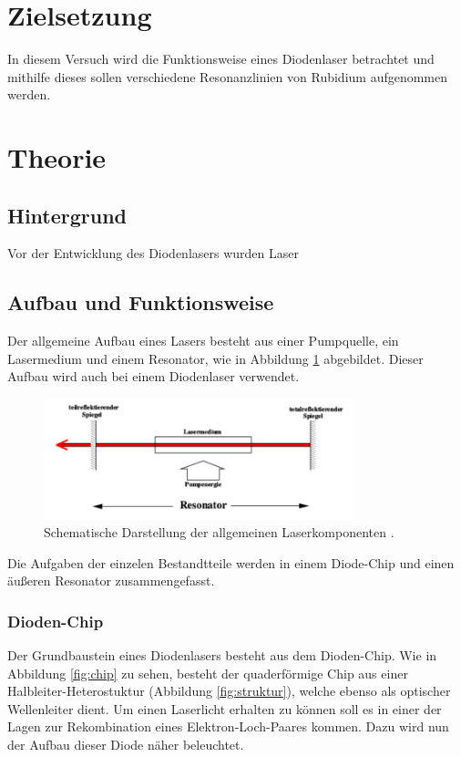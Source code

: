 \section{Zielsetzung}
\label{sec:Zielsetzung}
In diesem Versuch wird die Funktionsweise eines Diodenlaser betrachtet und
mithilfe dieses sollen verschiedene Resonanzlinien von Rubidium aufgenommen werden.

\section{Theorie}
\label{sec:Theorie}

\subsection{Hintergrund}
Vor der Entwicklung des Diodenlasers wurden Laser

\subsection{Aufbau und Funktionsweise}
Der allgemeine Aufbau eines Lasers besteht aus einer Pumpquelle, ein Lasermedium
und einem Resonator, wie in Abbildung \ref{fig:laser} abgebildet. Dieser Aufbau
wird auch bei einem Diodenlaser verwendet.
\begin{figure}[htb]
  \centering
  \includegraphics[width=0.8\textwidth]{images/V61.pdf}
  \caption{Schematische Darstellung der allgemeinen Laserkomponenten \cite{anleitung2}.}
  \label{fig:laser}
\end{figure}
Die Aufgaben der einzelen Bestandtteile werden in einem Diode-Chip und einen
äußeren Resonator zusammengefasst.

\subsubsection{Dioden-Chip}
Der Grundbaustein eines Diodenlasers besteht aus dem Dioden-Chip. Wie in
Abbildung \ref{fig:chip} zu sehen, besteht der quaderförmige Chip aus einer
Halbleiter-Heterostuktur (Abbildung \ref{fig:struktur}), welche ebenso als
optischer Wellenleiter dient. Um
einen Laserlicht erhalten zu können soll es in einer der Lagen zur Rekombination
eines Elektron-Loch-Paares kommen. Dazu wird nun der Aufbau dieser Diode näher
beleuchtet.

